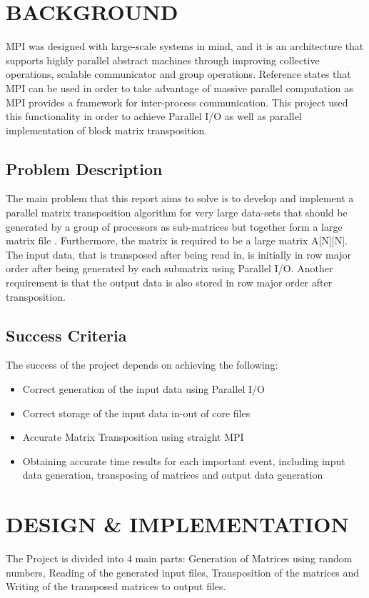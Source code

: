 \documentclass[11pt,conference]{IEEEtran}
\begin{document}
\section{BACKGROUND}
\noindent
 MPI was designed with large-scale systems in mind, and it is an architecture that supports highly parallel abstract machines through improving collective operations, scalable communicator and group operations. Reference \cite{10.1007/978-3-540-69389-5_29} states that MPI can be used in order to take advantage of massive parallel computation as MPI provides a framework for inter-process communication. This project used this functionality in order to achieve Parallel I/O as well as parallel implementation of block matrix transposition.
 
\subsection{Problem Description}
\noindent
The main problem that this report aims to solve is to develop and implement a parallel matrix transposition algorithm for very large data-sets that should be generated by a group of processors as sub-matrices but together form a large matrix file \cite{otto}. Furthermore, the matrix is required to be a large matrix A[N][N]. The input data, that is transposed after being read in, is initially in row major order after being generated by each submatrix using Parallel I/O. Another requirement is that the output data is also stored in row major order after transposition.

\subsection{Success Criteria}

\noindent
The success of the project depends on achieving the following:
\begin{itemize}
    \item Correct generation of the input data using Parallel I/O
    \item Correct storage of the input data in-out of core files
    \item Accurate Matrix Transposition using straight MPI
    \item Obtaining accurate time results for each important event, including input data generation, transposing of matrices and output data generation
\end{itemize}

\section{DESIGN \& IMPLEMENTATION}
\noindent
The Project is divided into 4 main parts: Generation of Matrices using random numbers, Reading of the generated input files, Transposition of the matrices and Writing of the transposed matrices to output files.
\end{document}
